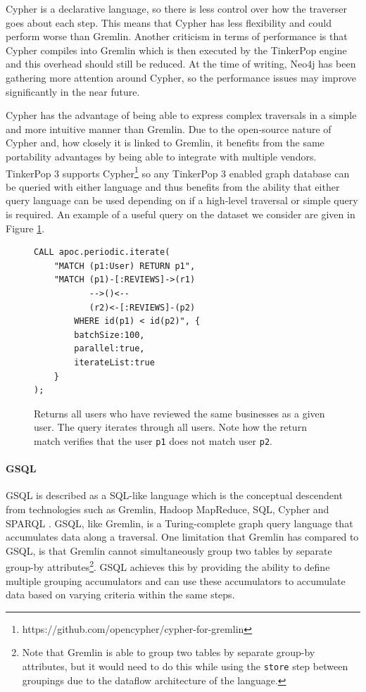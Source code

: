 Cypher is a declarative language, so there is less control over how the traverser goes about each step. This means that Cypher has less flexibility and could perform worse than Gremlin. Another criticism in terms of performance is that Cypher compiles into Gremlin which is then executed by the TinkerPop engine \cite{backtothefuture} and this overhead should still be reduced. At the time of writing, Neo4j has been gathering more attention around Cypher, so the performance issues may improve significantly in the near future.

Cypher has the advantage of being able to express complex traversals in a simple and more intuitive manner than Gremlin. Due to the open-source nature of Cypher and, how closely it is linked to Gremlin, it benefits from the same portability advantages by being able to integrate with multiple vendors. TinkerPop 3 supports Cypher\footnote{https://github.com/opencypher/cypher-for-gremlin} so any TinkerPop 3 enabled graph database can be queried with either language and thus benefits from the ability that either query language can be used depending on if a high-level traversal or simple query is required. An example of a useful query on the dataset we consider are given in Figure \ref{lst:cypher-example-1}.

\begin{figure}[h]
    \centering
    \begin{lstlisting}[language=cypher]
CALL apoc.periodic.iterate(
    "MATCH (p1:User) RETURN p1",
    "MATCH (p1)-[:REVIEWS]->(r1)
           -->()<--
           (r2)<-[:REVIEWS]-(p2)
        WHERE id(p1) < id(p2)", {
        batchSize:100,
        parallel:true,
        iterateList:true
    }
);
    \end{lstlisting}
    \caption{Returns all users who have reviewed the same businesses as a given user. The query iterates through all users. Note how the return match verifies that the user \texttt{p1} does not match user \texttt{p2}.}
    \label{lst:cypher-example-1}
\end{figure}

\paragraph{GSQL}

GSQL is described as a SQL-like language which is the conceptual descendent from technologies such as Gremlin, Hadoop MapReduce, SQL, Cypher and SPARQL \cite{gsql-tigergraph}. GSQL, like Gremlin, is a Turing-complete graph query language that accumulates data along a traversal. One limitation that Gremlin has compared to GSQL, is that Gremlin cannot simultaneously group two tables by separate group-by attributes\footnote{Note that Gremlin is able to group two tables by separate group-by attributes, but it would need to do this while using the \texttt{store} step between groupings due to the dataflow architecture of the language.}. GSQL achieves this by providing the ability to define multiple grouping accumulators and can use these accumulators to accumulate data based on varying criteria within the same steps.

